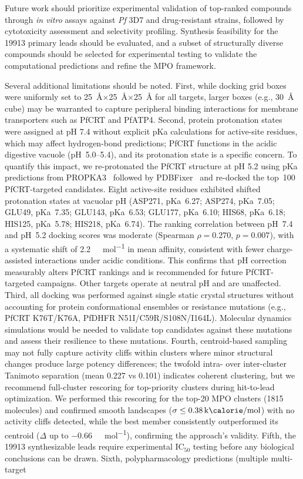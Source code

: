 \documentclass[journal=jcisd8,manuscript=article]{achemso}
\begin{document}
Future work should prioritize experimental validation of top-ranked compounds through \textit{in vitro} assays against \textit{Pf} 3D7 and drug-resistant strains, followed by cytotoxicity assessment and selectivity profiling. Synthesis feasibility for the \num{19913} primary leads should be evaluated, and a subset of structurally diverse compounds should be selected for experimental testing to validate the computational predictions and refine the MPO framework.

Several additional limitations should be noted. First, while docking grid boxes were uniformly set to \qty{25}{\angstrom}$\times$\qty{25}{\angstrom}$\times$\qty{25}{\angstrom} for all targets, larger boxes (e.g., \qty{30}{\angstrom} cube) may be warranted to capture peripheral binding interactions for membrane transporters such as PfCRT and PfATP4. Second, protein protonation states were assigned at pH 7.4 without explicit pKa calculations for active-site residues, which may affect hydrogen-bond predictions; PfCRT functions in the acidic digestive vacuole (pH~5.0--5.4), and its protonation state is a specific concern. To quantify this impact, we re-protonated the PfCRT structure at pH 5.2 using pKa predictions from PROPKA3~\cite{Olsson2011} followed by PDBFixer~\cite{Eastman2017} and re-docked the top~100 PfCRT-targeted candidates. Eight active-site residues exhibited shifted protonation states at vacuolar pH (ASP271, pKa~6.27; ASP274, pKa~7.05; GLU49, pKa~7.35; GLU143, pKa~6.53; GLU177, pKa~6.10; HIS68, pKa~6.18; HIS125, pKa~5.78; HIS218, pKa~6.74). The ranking correlation between pH~7.4 and pH~5.2 docking scores was moderate (Spearman $\rho = \num{0.270}$, $p = \num{0.007}$), with a systematic shift of \qty{+2.2}{\kilo\calorie\per\mole} in mean affinity, consistent with fewer charge-assisted interactions under acidic conditions. This confirms that pH correction measurably alters PfCRT rankings and is recommended for future PfCRT-targeted campaigns. Other targets operate at neutral pH and are unaffected. Third, all docking was performed against single static crystal structures without accounting for protein conformational ensembles or resistance mutations (e.g., PfCRT K76T/K76A, PfDHFR N51I/C59R/S108N/I164L). Molecular dynamics simulations would be needed to validate top candidates against these mutations and assess their resilience to these mutations. Fourth, centroid-based sampling may not fully capture activity cliffs within clusters where minor structural changes produce large potency differences; the twofold intra- over inter-cluster Tanimoto separation (mean \num{0.227} vs \num{0.101}) indicates coherent clustering, but we recommend full-cluster rescoring for top-priority clusters during hit-to-lead optimization. We performed this rescoring for the top-20 MPO clusters (\num{1815} molecules) and confirmed smooth landscapes ($\sigma \leq \qty{0.38}{\kilo\calorie\per\mole}$) with no activity cliffs detected, while the best member consistently outperformed its centroid ($\Delta$ up to \qty{-0.66}{\kilo\calorie\per\mole}), confirming the approach's validity. Fifth, the \num{19913} synthesizable leads require experimental IC$_{50}$ testing before any biological conclusions can be drawn. Sixth, polypharmacology predictions (multiple multi-target 
\end{document}
